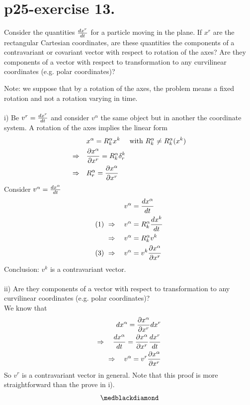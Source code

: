 \section{p25-exercise 13.}
\begin{tcolorbox}
Consider the quantities $\dv{x^r}{t}$ for a particle moving in the plane. If $x^r$ are the rectangular Cartesian coordinates, are these quantities the components of a contravariant or covariant vector with respect to rotation of the axes? Are they components of a vector with respect to transformation to any curvilinear coordinates (e.g. polar coordinates)?
\end{tcolorbox}
Note: we suppose that by a rotation of the axes, the problem means a fixed rotation and not a rotation varying in time.\\\\
 i) Be $v^{r} = \dv{x^r}{t}$ and consider $v^{\alpha}$  the same object but in another the coordinate system.
 A rotation of the axes implies the linear form
 \begin{align}
 \ &x^{\alpha} = R^{\alpha }_k x^k \quad \text{ with } R^{\alpha }_k \neq R^{\alpha }_k (x^k)\\
 \Rightarrow\quad  & \pdv{x^{\alpha}}{x^r} = R^{\alpha }_k \delta^k_r \\
 \Rightarrow\quad  & R^{\alpha }_r  = \pdv{x^{\alpha}}{x^r} 
 \end{align}
 Consider $v^{\alpha} = \dv{x^{\alpha}}{t}$
 \begin{align}
 v^{\alpha} &= \dv{x^{\alpha}}{t}\\
 \text{(1)   }\Rightarrow\quad v^{\alpha} &= R^{\alpha }_k \dv{x^k}{t}\\
 \Rightarrow\quad v^{\alpha} &= R^{\alpha }_k v^k\\
 \text{(3)   }\Rightarrow\quad v^{\alpha} &= v^k\pdv{x^{\alpha}}{x^r} 
 \end{align}
 Conclusion: $v^k$ is a contravariant vector.\\\\
 ii) Are they components of a vector with respect to transformation to any curvilinear coordinates (e.g. polar coordinates)?\\
We know that 
\begin{align}
\ dx^{\alpha} = \pdv{x^{\alpha}}{x^r}dx^r\\
\Rightarrow \quad \dv{x^{\alpha}}{t} = \pdv{x^{\alpha}}{x^r}\dv{x^r}{t}\\
\Rightarrow \quad v^{\alpha} = v^r\pdv{x^{\alpha}}{x^r}
\end{align}
So $v^r$ is a contravariant vector in general. Note that this proof is more straightforward than the prove in i).
$$\medblackdiamond$$
\pagebreak[4]

